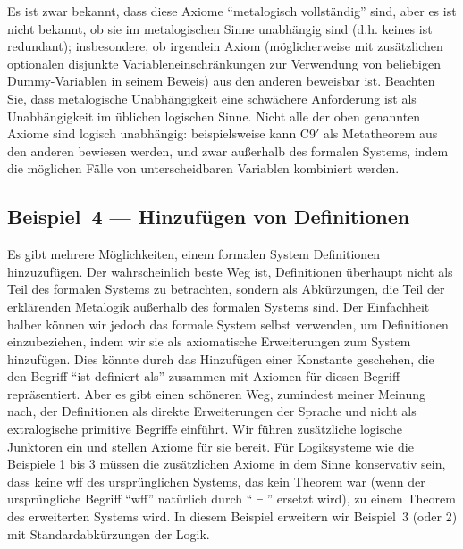 Es ist zwar bekannt, dass diese Axiome "`metalogisch vollständig"' sind, aber es ist nicht bekannt, ob sie im metalogischen Sinne unabhängig sind (d.h. keines ist redundant); insbesondere, ob irgendein Axiom (möglicherweise mit zusätzlichen optionalen disjunkte Variableneinschränkungen zur Verwendung von beliebigen Dummy-Variablen in seinem Beweis) aus den anderen beweisbar ist.  Beachten Sie, dass metalogische Unabhängigkeit eine schwächere Anforderung ist als Unabhängigkeit im üblichen logischen Sinne.  Nicht alle der oben genannten Axiome sind logisch unabhängig: beispielsweise kann C9$'$ als Metatheorem aus den anderen bewiesen werden, und zwar außerhalb des formalen Systems, indem die möglichen Fälle von unterscheidbaren Variablen kombiniert werden.

\subsection{Beispiel~4 --- Hinzufügen von Definitionen}

Es gibt mehrere Möglichkeiten, einem formalen System Definitionen hinzuzu\-fügen.  Der wahrscheinlich beste Weg ist, Definitionen überhaupt nicht als Teil des formalen Systems zu betrachten, sondern als Abkürzungen, die Teil der erklärenden Metalogik außerhalb des formalen Systems sind.  Der Einfachheit halber können wir jedoch das formale System selbst verwenden, um Definitionen einzubeziehen, indem wir sie als axiomatische Erweiterungen zum System hinzufügen.  Dies könnte durch das Hinzufügen einer Konstante geschehen, die den Begriff "`ist definiert als"' zusammen mit Axiomen für diesen Begriff repräsentiert. Aber es gibt einen schöneren Weg, zumindest meiner Meinung nach, der Definitionen als direkte Erweiterungen der Sprache und nicht als extralogische primitive Begriffe einführt.  Wir führen zusätzliche logische Junktoren ein und stellen Axiome für sie bereit.  Für Logiksysteme wie die Beispiele 1 bis 3 müssen die zusätzlichen Axiome in dem Sinne konservativ sein, dass keine wff des ursprünglichen Systems, das kein Theorem war (wenn der ursprüngliche Begriff "`wff"' natürlich durch "`$\vdash$"' ersetzt wird), zu einem Theorem des erweiterten Systems wird.  In diesem Beispiel erweitern wir Beispiel~3 (oder 2) mit Standardabkürzungen der Logik.

